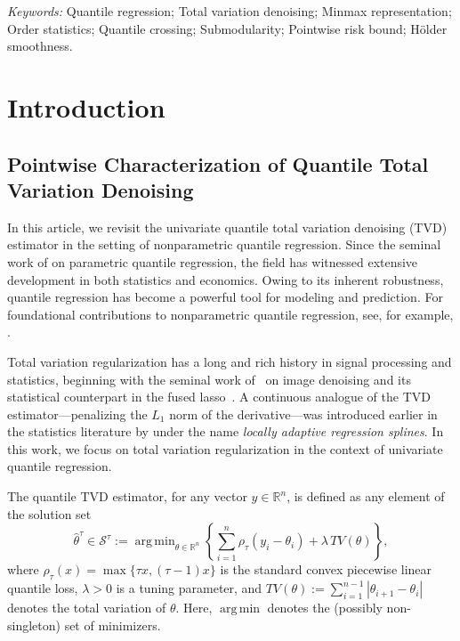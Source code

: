 \documentclass[11pt]{article}
\newcommand{\R}{\mathbb{R}}
\newcommand{\cS}{\mathcal{S}}
\newcommand{\bR}{\mathbb{R}}
\DeclareMathOperator*{\argmin}{arg\,min}
\theoremstyle{plain}
\theoremstyle{definition}
\theoremstyle{remark}
\begin{document}
\noindent%
{\it Keywords:}
Quantile regression; Total variation denoising; Minmax representation; Order statistics; Quantile crossing; Submodularity; Pointwise risk bound; H\"{o}lder smoothness.




\section{Introduction}\label{sec:intro}
\subsection{Pointwise Characterization of Quantile Total Variation Denoising}\label{sec:intro_qtltvd}
In this article, we revisit the univariate quantile total variation denoising (TVD) estimator in the setting of nonparametric quantile regression. Since the seminal work of \cite{koenker1978regression} on parametric quantile regression, the field has witnessed extensive development in both statistics and economics. Owing to its inherent robustness, quantile regression has become a powerful tool for modeling and prediction. For foundational contributions to nonparametric quantile regression, see, for example, \cite{utreras1981computing, cox1983asymptotics, koenker1994quantile, chaudhuri1991nonparametric}.

Total variation regularization has a long and rich history in signal processing and statistics, beginning with the seminal work of~\cite{rudin1992nonlinear} on image denoising and its statistical counterpart in the fused lasso~\cite{tibshirani2005sparsity}. A continuous analogue of the TVD estimator—penalizing the $L_1$ norm of the derivative—was introduced earlier in the statistics literature by \cite{mammen1997locally} under the name \emph{locally adaptive regression splines}. In this work, we focus on total variation regularization in the context of univariate quantile regression.

The quantile TVD estimator, for any vector $y \in \R^n$, is defined as any element of the solution set
\begin{equation}\label{eqn:defn_qtl_TVD}
\hat{\theta}^{\tau}\in\cS^{\tau}:=\argmin_{\theta \in \bR^n}\left\{\sum_{i=1}^{n}\rho_{\tau}(y_i-\theta_i)+\lambda\,TV(\theta)\right\},
\end{equation}
where $\rho_{\tau}(x)=\max\{\tau x, (\tau-1)x\}$ is the standard convex piecewise linear quantile loss, $\lambda>0$ is a tuning parameter, and $TV(\theta):=\sum_{i=1}^{n-1}|\theta_{i+1}-\theta_i|$ denotes the total variation of $\theta$. Here, $\argmin$ denotes the (possibly non-singleton) set of minimizers.
\end{document}
